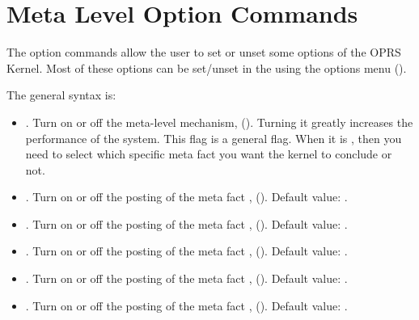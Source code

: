 \section{\CPK{} Meta Level Option Commands}

The option commands allow the user to set or unset some options of the OPRS
Kernel. Most of these options can be set/unset in the \XPK{} using the options
menu ().

The general syntax is:


\begin{itemize}

\item {}. Turn on or off the meta-level mechanism,
().  Turning it  greatly increases the
performance of the system. This flag is a general flag. When it is ,
then you need to select which specific meta fact you want the kernel to
conclude or not.

\item {}. Turn on or off the posting of the meta fact
, (). Default value:
.

\item {}. Turn on or off the posting of the meta
fact , (). Default
value: .

\item {}. Turn on or off the posting of the meta
fact , ().  Default
value: .

\item {}. Turn on or off the posting of the
meta fact , ().
Default value: .

\item {}. Turn on or off the posting of the
meta fact , ().
Default value: .

\end{itemize}

